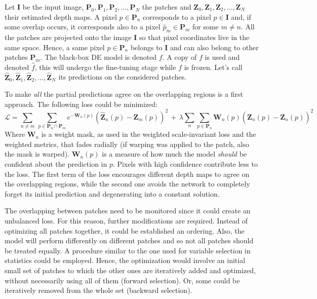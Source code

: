 Let $\mathbf{I}$ be the input image, $\mathbf{P}_{0}, \mathbf{P}_{1}, \mathbf{P}_{2}, \dotsc, \mathbf{P}_{N}$ the patches and $\mathbf{Z}_{0}, \mathbf{Z}_{1}, \mathbf{Z}_{2}, \dotsc, \mathbf{Z}_{N}$ their estimated depth maps.
A pixel $p \in \mathbf{P}_{n}$ corresponds to a pixel $\hat{p} \in \mathbf{I}$ and, if some overlap occurs, it corresponds also to a pixel $\hat{p}_{m} \in \mathbf{P}_{m}$ for some $m \neq n$.
All the patches are projected onto the image $\mathbf{I}$ so that pixel coordinates live in the same space.
Hence, a same pixel $p \in \mathbf{P}_{n}$ belongs to $\mathbf{I}$ and can also belong to other patches $\mathbf{P}_{m}$.
The black-box DE model is denoted $f$.
A copy of $f$ is used and denoted $\hat{f}$, this will undergo the fine-tuning stage while $f$ is frozen.
Let's call $\hat{\mathbf{Z}}_{0}, \hat{\mathbf{Z}}_{1}, \hat{\mathbf{Z}}_{2}, \dotsc, \hat{\mathbf{Z}}_{N}$ its predictions on the considered patches.

To make \textit{all} the partial predictions agree on the overlapping regions is a first approach.
The following loss could be minimized:
\[
    \mathcal{L} =
        \sum_{n \neq m} \,
        \sum_{p \in \mathbf{P}_{n} \cap \mathbf{P}_{m}}
        e^{-\mathbf{W}_{n}(p)}
        (\hat{\mathbf{Z}}_{n}(p) - \mathbf{Z}_{m}(p))^{2}
        \, + \,
        \lambda
        \sum_{n}
        \sum_{p \in \mathbf{P}_{n}}
        \mathbf{W}_{n}(p)
        (\hat{\mathbf{Z}}_{n}(p) - \mathbf{Z}_{n}(p))^{2}
\]
Where $\mathbf{W}_{n}$ is a weight mask, as used in the weighted scale-invariant loss and the weighted metrics, that fades radially (if warping was applied to the patch, also the mask is warped).
$\mathbf{W}_{n}(p)$ is a measure of how much the model \textit{should} be confident about the prediction in $p$.
Pixels with high confidence contribute less to the loss.
The first term of the loss encourages different depth maps to agree on the overlapping regions, while the second one avoids the network to completely forget its initial prediction and degenerating into a constant solution. 

\vspace{0.5cm}

The overlapping between patches need to be monitored since it could create an unbalanced loss.
For this reason, further modifications are required.
Instead of optimizing all patches together, it could be established an ordering.
Also, the model will perform differently on different patches and so not all patches should be treated equally.
A procedure similar to the one used for variable selection in statistics could be employed.
Hence, the optimization would involve an initial small set of patches to which the other ones are iteratively added and optimized, without necessarily using all of them (forward selection).
Or, some could be iteratively removed from the whole set (backward selection).

